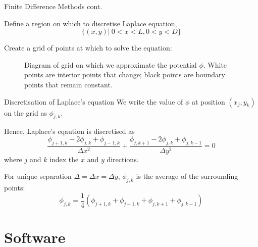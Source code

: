 \documentclass{beamer}
\newcommand{\be}{\begin{equation}}
\newcommand{\ee}{\end{equation}}
\begin{document}
\begin{frame}{Finite Difference Methods cont.}

Define a region on which to discretise Laplace equation, 
%
\be
\{(x,y)|\:0<x<L,0<y<D\}
\ee

Create a grid of points at which to solve the equation:

\begin{figure}
\centering
{}
\caption{Diagram of grid on which we approximate the potential $\phi$. White points
are interior points that change; black points are boundary points that remain constant.}
\end{figure}

\end{frame}

\begin{frame}{Discretisation of Laplace's equation}
We write the value of $\phi$ at position $(x_j,y_k)$ on the grid as $\phi_{j,k}$.

Hence, Laplace's eqaution is discretised as
%
\be
\frac{\phi_{j+1,k}-2\phi_{j,k}+\phi_{j-1,k}}{\Delta x^2} + \frac{\phi_{j,k+1}-2\phi_{j,k}+\phi_{j,k-1}}{\Delta y^2}=0
\ee
%
where $j$ and $k$ index the $x$ and $y$ directions.

For unique separation $\Delta = \Delta x = \Delta y$, $\phi_{j,k}$ is the average of the
surrounding points:
%
\be
\phi_{j,k}= \frac{1}{4}(\phi_{j+1,k}+\phi_{j-1,k}+\phi_{j,k+1}+\phi_{j,k-1})
\ee

\end{frame}

\section{Software}
\end{document}
